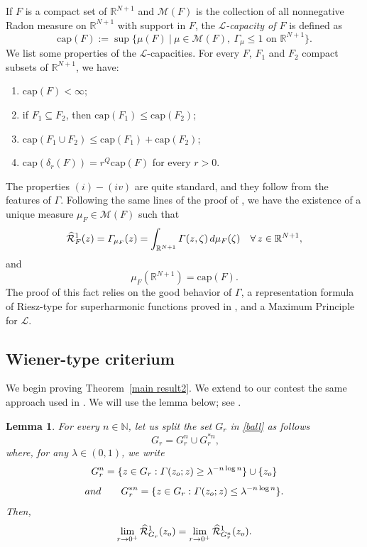 \documentclass{amsart}
\newtheorem{lemma}[thm]{Lemma}
\numberwithin{equation}{section}
\def \Lc{{\mathcal{L}}}
\def \r{{\mathbb{R}}}
\def \balayage{{\widehat{\mathcal{R}}}}
\renewcommand{\Gamma}{\varGamma}
\begin{document}
{If $F$ is a compact set of $\r^{N+1}$ and $\mathcal{M}(F)$ is the collection of all nonnegative Radon measure on $\r^{N+1}$ with support in $F$,
the {\it $\Lc$-capacity of $F$} is defined as
\[
\mathrm{cap} (F) := \sup\{ \mu(F)\ | \ \mu\in\mathcal{M}(F), \ \Gamma_\mu \le 1 \mbox{ on } \r^{N+1}\}.
\]
We list some properties of the $\Lc$-capacities. For every $F$, $F_1$ and $F_2$ compact subsets of $\r^{N+1}$, we have:
\begin{enumerate}[\it (i)]
\item $\mathrm{cap} (F) < \infty $;
\item if $F_1\subseteq F_2$, then $\mathrm{cap} (F_1) \le \mathrm{cap} (F_2)$;
\item $\mathrm{cap} (F_1 \cup F_2) \le \mathrm{cap}(F_1) + \mathrm{cap} (F_2)$;
\item $\mathrm{cap} (\delta_r (F)) = r^{Q} \mathrm{cap} ( F)$ for every $r>0$.
\end{enumerate} 
The properties $(i)-(iv)$ are quite standard, and they follow from the features of $\Gamma$. Following the same lines of the proof of \cite[Teorema 1.1]{L73}, we have the existence of a unique measure $\mu_F\in \mathcal{M}(F)$ such that 
\[
\balayage_F^1(z)=\Gamma_{\mu_F}(z)=\int_{\r^{N+1}}{\Gamma(z,\zeta)\,\rm{d}\mu_F(\zeta)}\quad \forall \, z\in\r^{N+1},
\]
and 
\[
\mu_F(\r^{N+1})=\mathrm{cap} (F).
\]
The proof of this fact relies on the good behavior of $\Gamma$, a representation formula of Riesz-type 
for superharmonic functions proved in \cite[Theorem 5.1]{CL09}, and a Maximum Principle for $\Lc$. 

\subsection{Wiener-type criterium}
We begin proving Theorem~\ref{main result2}. We extend to our contest the same approach used in \cite{KLT18}. We will use the lemma below; see \cite[Lemma 5.1]{KLT18}.
\begin{lemma}
	\label{sec6 lem1}
For every $n \in \mathbb{N}$, let us split the set $G_r$ in \eqref{ball} as follows
$$
\	G_r = 	G_r^n \cup 	G_r^{*n},
$$
where, for any $\lambda \in (0,1)$, we write
$$
G_r^n = \{z \in G_r : \Gamma(z_{\rm o};z) \geq \lambda^{-n\log n}\} \cup \{z_{\rm o}\}
$$
$$
and \qquad G_r^{*n}=\{z \in G_r : \Gamma(z_{\rm o};z) \leq \lambda^{-n\log n}\}.
$$
Then,
$$
\lim_{r \rightarrow 0^+}\balayage^1_{G_r}(z_{\rm o})= \lim_{r \rightarrow 0^+}\balayage^1_{G_r^n}(z_{\rm o}).
$$
\end{lemma}


}
\end{document}
